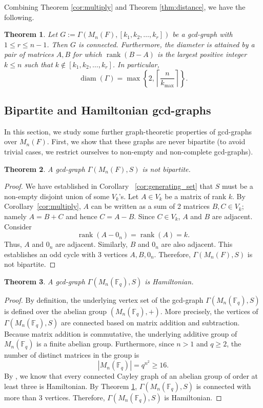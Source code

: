 \documentclass[12pt, a4paper]{amsart}
\newtheorem{thm}{Theorem}[section]
\theoremstyle{definition}
\numberwithin{equation}{section}
\newcommand{\F}{\mathbb{F}}
\DeclareMathOperator{\rank}{rank}
\DeclareMathOperator{\diam}{diam}
\begin{document}
Combining Theorem \ref{cor:multiply} and Theorem \ref{thm:distance}, we have the following.
\begin{thm} \label{cor:diameter}
Let \(G:=\Gamma(M_n(F), [k_1, k_2, \ldots, k_r])\) be a gcd-graph with \(1 \leq r \leq n-1\). Then $G$ is connected. Furthermore, the diameter is attained by a pair of matrices \(A,B\) for which \(\rank(B-A)\) is the largest positive integer \(k \leq n\) such that \(k \notin [k_1, k_2, \ldots, k_r]\). In particular,
\[
\diam(\Gamma) = \max \left\{2, \left\lceil \frac{n}{k_{\max}} \right\rceil \right\}.
\]
\end{thm}

\subsection{Bipartite and Hamiltonian gcd-graphs} \label{subsec:bipartite}
In this section, we study some further graph-theoretic properties of gcd-graphs over $M_n(F)$. First, we show that these graphs are never bipartite (to avoid trivial cases, we restrict ourselves to non-empty and non-complete gcd-graphs).
\begin{thm} \label{thm:bipartite}
    A gcd-graph $\Gamma(M_n(F), S)$ is not bipartite.
\end{thm}
\begin{proof}
    We have established in Corollary ~\ref{cor:generating_set} that $S$ must be a non-empty disjoint union of some $V_k$'s. Let $A \in V_k$ be a matrix of rank $k$. By Corollary~\ref{cor:multiply}, $A$ can be written as a sum of 2 matrices $B,C \in V_k$; namely $A = B + C$ and hence  $C = A-B.$ Since $C \in V_k$, $A$ and $B$ are adjacent. Consider
    \[\rank(A-0_n) = \rank(A) = k.\]
    Thus, $A$ and $0_n$ are adjacent. Similarly, $B$ and $0_n$ are also adjacent. This establishes an odd cycle with 3 vertices $A,B,0_n$. Therefore, $\Gamma(M_n(F), S)$ is not bipartite.
\end{proof}

\begin{thm}
    A gcd-graph $\Gamma(M_n(\F_q), S)$ is Hamiltonian.
\end{thm}
\begin{proof}
By definition, the underlying vertex set of the gcd-graph $\Gamma(M_n(\F_q), S)$ is  defined over the abelian group $(M_n(\F_q),+)$. More precisely, the vertices of $\Gamma(M_n(\F_q),S)$ are connected based on matrix addition and subtraction. Because matrix addition is commutative, the underlying additive group of $M_n(\F_q)$ is a finite abelian group. Furthermore, since $n > 1$ and $q \ge 2$, the number of distinct matrices in the group is
    \[|M_n(\F_q)| = q^{n^2} \geq 16.\]
    By \cite[Corollary 3.2]{MARUSIC198349}, we know that every connected Cayley graph of an abelian group of order at least three is Hamiltonian. By  Theorem \ref{cor:diameter}, $\Gamma(M_n(\F_q), S)$ is connected with more than $3$ vertices.  Therefore, $\Gamma(M_n(\F_q), S)$ is Hamiltonian.
\end{proof}
\end{document}
